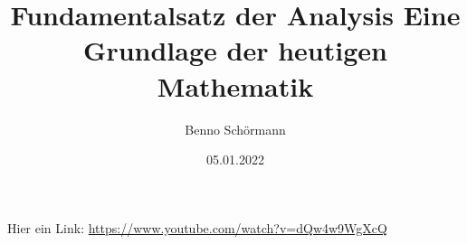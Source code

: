 \documentclass[12pt,a4paper,draft]{article}
\begin{document}
\title{Fundamentalsatz der Analysis\newline
\newline Eine Grundlage der heutigen Mathematik}
\author{Benno Schörmann}
\date{05.01.2022}
\maketitle
Hier ein Link: \url{https://www.youtube.com/watch?v=dQw4w9WgXcQ}
\end{document}
